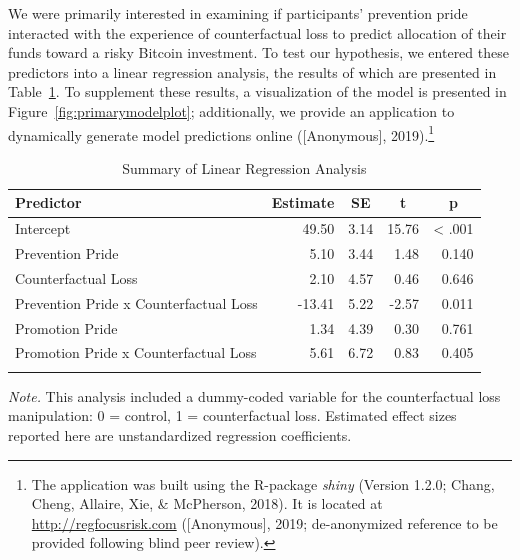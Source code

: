 \documentclass[man,floatsintext]{apa6}
\let\rmarkdownfootnote\footnote%
\def\footnote{\protect\rmarkdownfootnote}
\begin{document}
We were primarily interested in examining if participants' prevention pride interacted with the experience of counterfactual loss to predict allocation of their funds toward a risky Bitcoin investment. To test our hypothesis, we entered these predictors into a linear regression analysis, the results of which are presented in Table~\ref{tab:primarymodelprint}. To supplement these results, a visualization of the model is presented in Figure~\ref{fig:primarymodelplot}; additionally, we provide an application to dynamically generate model predictions online ({[}Anonymous{]}, 2019).\footnote{The application was built using the R-package \emph{shiny} (Version 1.2.0; Chang, Cheng, Allaire, Xie, \& McPherson, 2018). It is located at \url{http://regfocusrisk.com} ({[}Anonymous{]}, 2019; de-anonymized reference to be provided following blind peer review).}

\begin{table}[tbp]

\begin{center}
\begin{threeparttable}

\caption{\label{tab:primarymodelprint}Summary of Linear Regression Analysis}

\begin{tabular}{lrrrr}
\toprule
Predictor & \multicolumn{1}{c}{Estimate} & \multicolumn{1}{c}{SE} & \multicolumn{1}{c}{t} & \multicolumn{1}{c}{p}\\
\midrule
Intercept & 49.50 & 3.14 & 15.76 & < .001\\
Prevention Pride & 5.10 & 3.44 & 1.48 & 0.140\\
Counterfactual Loss & 2.10 & 4.57 & 0.46 & 0.646\\
Prevention Pride x Counterfactual Loss & -13.41 & 5.22 & -2.57 & 0.011\\
Promotion Pride & 1.34 & 4.39 & 0.30 & 0.761\\
Promotion Pride x Counterfactual Loss & 5.61 & 6.72 & 0.83 & 0.405\\
\bottomrule
\addlinespace
\end{tabular}

\begin{tablenotes}[para]
\normalsize{\textit{Note.} This analysis included a dummy-coded variable for the counterfactual loss manipulation: 0 = control, 1 = counterfactual loss. Estimated effect sizes reported here are unstandardized regression coefficients.}
\end{tablenotes}

\end{threeparttable}
\end{center}

\end{table}
\end{document}
